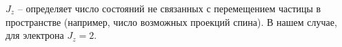 $J_{z}$ -- определяет число состояний не связанных с перемещением частицы в пространстве (например, число возможных проекций спина). В нашем случае, для электрона $J_{z}=2$.









